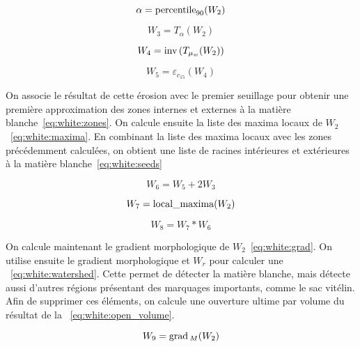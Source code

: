 \documentclass[\main/main.tex]{subfiles}
\begin{document}
\begin{equation}
\label{eq:white:thresh:value:high}
    \alpha = \operatorname{\textnormal{percentile}}_{90}(W_2)
\end{equation}

\begin{equation}
\label{eq:white:thresh:high}
    W_3 = T_{\alpha}(W_2)
\end{equation}

\begin{equation}
\label{eq:white:thresh:low}
    W_4 = \operatorname{\textnormal{inv}}{}(T_{\mu_w}(W_2))
\end{equation}

\begin{equation}
\label{eq:white:erod_1}
    W_5 = \varepsilon_{c_{15}}(W_4)
\end{equation}

%
On associe le résultat de cette érosion avec le premier seuillage pour obtenir une première approximation des zones internes et externes à la matière blanche~\eqref{eq:white:zones}.
%
On calcule ensuite la liste des maxima locaux de $W_2$~\eqref{eq:white:maxima}.
%
En combinant la liste des maxima locaux avec les zones précédemment calculées,
on obtient une liste de racines intérieures et extérieures à la matière blanche~\eqref{eq:white:seeds}

\begin{equation}
\label{eq:white:zones}
    W_6 = W_5 + 2W_3
\end{equation}

\begin{equation}
\label{eq:white:maxima}
    W_7 = \operatorname{\textnormal{local\_maxima}}(W_2)
\end{equation}

\begin{equation}
\label{eq:white:seeds}
    W_8 = W_7 * W_6
\end{equation}

%
On calcule maintenant le gradient morphologique de $W_2$~\eqref{eq:white:grad}.
%
On utilise ensuite le gradient morphologique et $W_r$ pour calculer une \watershed{}~\eqref{eq:white:watershed}.
%
Cette \watershed{} permet de détecter la matière blanche, mais détecte aussi d'autres régions présentant des marquages importants, comme le sac vitélin.
%
Afin de supprimer ces éléments, on calcule une ouverture ultime par volume du résultat de la \watershed{}~\eqref{eq:white:open_volume}.

\begin{equation}
\label{eq:white:grad}
    W_9 = \operatorname{\textnormal{grad}}{}_M(W_2)
\end{equation}
\end{document}
